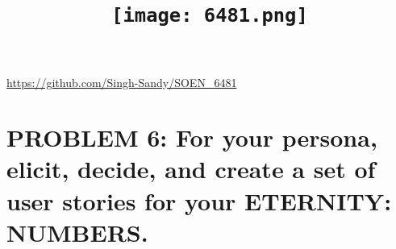 \documentclass[12pt, a4paper]{article}
\begin{document}
 

\begin{titlepage}
\title{\texttt{[image: 6481.png]}}
\end{titlepage}

\maketitle
\begin{center}
\url{https://github.com/Singh-Sandy/SOEN_6481}
\end{center}
\thispagestyle{empty}


\newpage

\tableofcontents
\thispagestyle{empty}




						
    
\newpage
\setcounter{page}{1}
\section{PROBLEM 6: For your persona, elicit, decide, and create a set of user stories for your ETERNITY: NUMBERS. }
\end{document}
